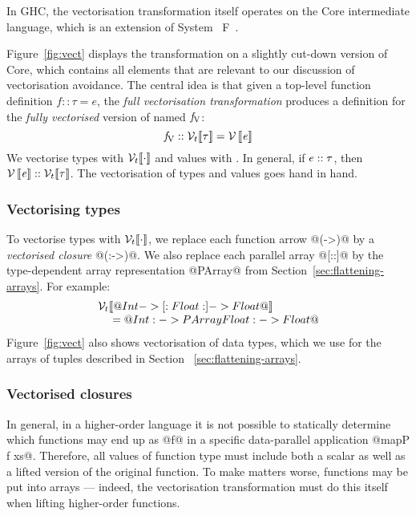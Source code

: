 In GHC, the vectorisation transformation itself operates on the Core intermediate language, which is an extension of System~ F~\cite{sulzmann-et-al:fc}.

Figure~\ref{fig:vect} displays the transformation on a slightly cut-down version of Core, which contains all elements that are relevant to our discussion of vectorisation avoidance. The central idea is that given a top-level function definition $f::\tau = e$, the \emph{full vectorisation transformation} produces a definition for
the \emph{fully vectorised} version of  named $\mathit{f}_{\mathrm{V}}$:
\[
\mathit{f}_{\mathrm{V}} :: \mathcal{V}_t\llbracket \tau \rrbracket = \mathcal{V}\left\llbracket \mathit{e} \right\rrbracket
\]
We vectorise types with $\mathcal{V}_t\llbracket \cdot \rrbracket$ and values with \VT{\cdot}.  In general, if
$e::\mathit{\tau}$, then $\mathcal{V}\left\llbracket \mathit{e} \right\rrbracket::\mathcal{V}_t\llbracket \mathit{\tau} \rrbracket$. The vectorisation of types and values goes hand in hand.


\subsubsection{Vectorising types}

To vectorise types with  $\mathcal{V}_t\llbracket \cdot \rrbracket$, we replace each function arrow @(->)@ by a \emph{vectorised closure} @(:->)@. We also replace each parallel array @[::]@ by the type-dependent array representation @PArray@ from Section~\ref{sec:flattening-arrays}. For example: 
%
\[
\begin{array}{l}
\mathcal{V}_t\llbracket @Int -> [:Float:] -> Float@ \rrbracket \\
\quad {}={} @Int :-> PArray Float :-> Float@
\end{array}
\]
Figure~\ref{fig:vect} also shows vectorisation of data types, which we use for the arrays of tuples described in Section~ \ref{sec:flattening-arrays}.


\eject
\subsubsection{Vectorised closures}
\label{sec:vect-closures}

In general, in a higher-order language it is not possible to statically determine which functions may end up as @f@ in a specific data-parallel application @mapP f xs@. Therefore, all values of function type must include both a scalar as well as a lifted version of the original function. To make matters worse, functions may be put into arrays --- indeed, the vectorisation transformation must do this itself when lifting higher-order functions. 

